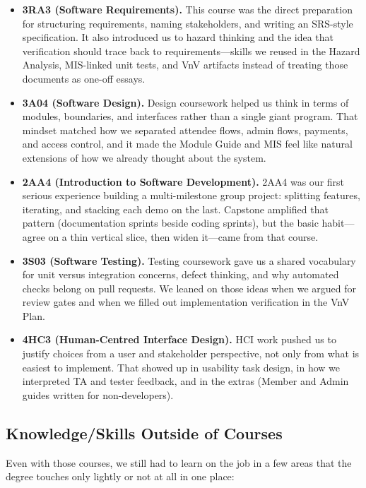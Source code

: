 \documentclass{article}
\begin{document}
\begin{itemize}
  \item \textbf{3RA3 (Software Requirements).} This course was the direct preparation for
        structuring requirements, naming stakeholders, and writing an
        SRS-style specification. It also introduced us to hazard thinking and the idea
        that verification should trace back to requirements---skills we reused in the
        Hazard Analysis, MIS-linked unit tests, and VnV artifacts instead of treating
        those documents as one-off essays.
  \item \textbf{3A04 (Software Design).} Design coursework helped us think in
        terms of modules, boundaries, and interfaces rather than a single giant
        program. That mindset matched how we separated attendee flows, admin flows,
        payments, and access control, and it made the Module Guide and MIS feel like
        natural extensions of how we already thought about the system.
  \item \textbf{2AA4 (Introduction to Software Development).} 2AA4 was our first
        serious experience building a multi-milestone group project: splitting
        features, iterating, and stacking each demo on the last. Capstone amplified that
        pattern (documentation sprints beside coding sprints), but the basic habit---agree
        on a thin vertical slice, then widen it---came from that course.
  \item \textbf{3S03 (Software Testing).} Testing coursework gave us a shared
        vocabulary for unit versus integration concerns, defect thinking, and
        why automated checks belong on pull requests. We leaned on those ideas when we
        argued for review gates and when we filled out implementation verification in
        the VnV Plan.
  \item \textbf{4HC3 (Human-Centred Interface Design).} HCI work pushed us to
        justify choices from a user and stakeholder perspective, not only from
        what is easiest to implement. That showed up in usability task design, in how
        we interpreted TA and tester feedback, and in the extras (Member and Admin
        guides written for non-developers).
\end{itemize}

\subsection{Knowledge/Skills Outside of Courses}

Even with those courses, we still had to learn on the job in a few areas
that the degree touches only lightly or not at all in one place:
\end{document}
